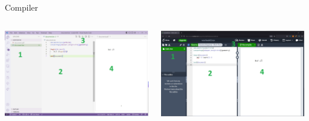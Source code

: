 \copyrightVincent

\begin{frame}[fragile]{Compiler}
    \centering

    \begin{columns}
        \begin{column}{0.5\textwidth}
            \includegraphics[width=\linewidth,height=0.8\textheight,keepaspectratio]
            {assets/vscode_compile_parts.png}
        \end{column}
        \begin{column}{0.5\textwidth}
            \includegraphics[width=\linewidth,height=0.8\textheight,keepaspectratio]
            {assets/overleaf_compile_parts.png}
        \end{column}
    \end{columns}
\end{frame}

